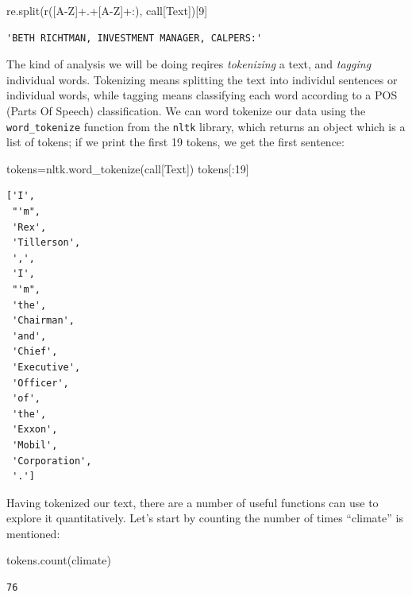 \documentclass[
  letterpaper,
  DIV=11,
  numbers=noendperiod]{scrreprt}
\newenvironment{Shaded}{\begin{snugshade}}{\end{snugshade}}
\newcommand{\DecValTok}[1]{\textcolor[rgb]{0.68,0.00,0.00}{#1}}
\newcommand{\NormalTok}[1]{\textcolor[rgb]{0.00,0.23,0.31}{#1}}
\newcommand{\OperatorTok}[1]{\textcolor[rgb]{0.37,0.37,0.37}{#1}}
\newcommand{\StringTok}[1]{\textcolor[rgb]{0.13,0.47,0.30}{#1}}
\newcommand{\VerbatimStringTok}[1]{\textcolor[rgb]{0.13,0.47,0.30}{#1}}
\begin{document}
\begin{Shaded}
\begin{Highlighting}[]
\NormalTok{re.split(}\VerbatimStringTok{r\textquotesingle{}([A{-}Z]+.+[A{-}Z]+:)\textquotesingle{}}\NormalTok{, call[}\StringTok{\textquotesingle{}Text\textquotesingle{}}\NormalTok{])[}\DecValTok{9}\NormalTok{]}
\end{Highlighting}
\end{Shaded}

\begin{verbatim}
'BETH RICHTMAN, INVESTMENT MANAGER, CALPERS:'
\end{verbatim}

The kind of analysis we will be doing reqires \emph{tokenizing} a text,
and \emph{tagging} individual words. Tokenizing means splitting the text
into individul sentences or individual words, while tagging means
classifying each word according to a POS (Parts Of Speech)
classification. We can word tokenize our data using the
\texttt{word\_tokenize} function from the \texttt{nltk} library, which
returns an object which is a list of tokens; if we print the first 19
tokens, we get the first sentence:

\begin{Shaded}
\begin{Highlighting}[]
\NormalTok{  tokens}\OperatorTok{=}\NormalTok{nltk.word\_tokenize(call[}\StringTok{\textquotesingle{}Text\textquotesingle{}}\NormalTok{])  }
\NormalTok{  tokens[:}\DecValTok{19}\NormalTok{]}
\end{Highlighting}
\end{Shaded}

\begin{verbatim}
['I',
 "'m",
 'Rex',
 'Tillerson',
 ',',
 'I',
 "'m",
 'the',
 'Chairman',
 'and',
 'Chief',
 'Executive',
 'Officer',
 'of',
 'the',
 'Exxon',
 'Mobil',
 'Corporation',
 '.']
\end{verbatim}

Having tokenized our text, there are a number of useful functions can
use to explore it quantitatively. Let's start by counting the number of
times ``climate'' is mentioned:

\begin{Shaded}
\begin{Highlighting}[]
\NormalTok{tokens.count(}\StringTok{\textquotesingle{}climate\textquotesingle{}}\NormalTok{)}
\end{Highlighting}
\end{Shaded}

\begin{verbatim}
76
\end{verbatim}
\end{document}
